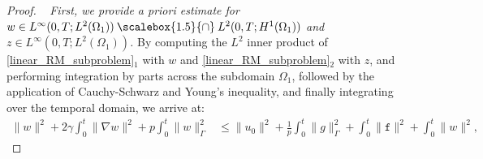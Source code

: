 \documentclass[11pt]{article}
\newcommand*{\medcap}{\mathbin{\scalebox{1.5}{\ensuremath{\cap}}}}
\begin{document}
\begin{proof}~
\textit{First, we provide a priori estimate for $w\in L^{\infty}(0,T; L^2(\Omega_1))\medcap L^{2}(0,T; H^1(\Omega_1))$ and $z\in L^{\infty}(0,T; L^2(\Omega_1))$.} By computing the $L^2$ inner product of \eqref{linear_RM_subproblem}$_{1}$ with $w$ and \eqref{linear_RM_subproblem}$_{2}$ with $z$, and performing integration by parts across the subdomain $\Omega_1$, followed by the application of Cauchy-Schwarz and Young's inequality, and finally integrating over the temporal domain, we arrive at:
\begin{equation}\label{apriori1}
\begin{aligned}
\parallel w\parallel^2 + 2\gamma\int_{0}^t \parallel\nabla w \parallel^2 + p \int_0^t \parallel w \parallel^2_{\Gamma}  & \leq \parallel u_0\parallel^2 + \frac{1}{p}\int_0^t \parallel g \parallel^2_{\Gamma}
+ \int_0^t \parallel \mathtt{f} \parallel^2 + \int_0^t \parallel w \parallel^2,
\end{aligned}
\end{equation}
 

\end{proof}
\end{document}
